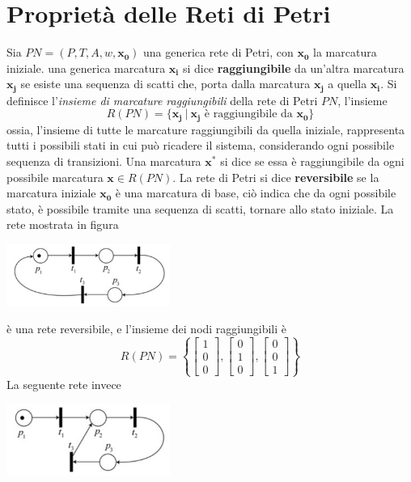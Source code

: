 \documentclass[10pt, letterpaper]{report}
\begin{document}
\section{Proprietà delle Reti di Petri}
Sia $PN=(P,T,A,w,\mathbf {x_0})$ una generica rete di Petri, con $\mathbf{x_0}$ la marcatura iniziale.\acc 
{} una generica marcatura $\mathbf{x_i}$ si dice \textbf{raggiungibile} da un'altra marcatura $\mathbf{x_j}$ se esiste una sequenza di scatti che, porta dalla marcatura $\mathbf{x_j}$ a quella $\mathbf{x_i}$.\acc 
Si definisce l'\textit{insieme di marcature raggiungibili} della rete di Petri $PN$, l'insieme 
$$ R(PN)=\{\mathbf{x_j} \ | \ \mathbf{x_j} \text{ è raggiungibile da }\mathbf{x_0}\}$$
ossia, l'insieme di tutte le marcature raggiungibili da quella iniziale, rappresenta tutti i possibili stati in cui può ricadere il sistema, considerando ogni possibile sequenza di transizioni.\acc 
Una marcatura $\mathbf{x^*}$ si dice  se essa è raggiungibile da ogni possibile marcatura $\mathbf{x}\in R(PN)$.\acc 
{} La rete di Petri si dice \textbf{reversibile} se la marcatura iniziale $\mathbf{x_0}$ è una marcatura di base, ciò indica che da ogni possibile stato, è possibile tramite una sequenza di scatti, tornare allo stato iniziale.
\acc La rete mostrata in figura \begin{center}
    \includegraphics[width=0.4\textwidth]{images/reversibile.png}
\end{center}
è una rete reversibile, e l'insieme dei nodi raggiungibili è 
$$R(PN) = \left\{ \begin{bmatrix} 1 \\ 0 \\ 0 \end{bmatrix}, \begin{bmatrix} 0 \\ 1 \\ 0 \end{bmatrix}, \begin{bmatrix} 0 \\ 0 \\ 1 \end{bmatrix} \right\}$$
La seguente rete invece\begin{center}
    \includegraphics[width=0.4\textwidth]{images/irreversibile.png}
\end{center}
\end{document}

